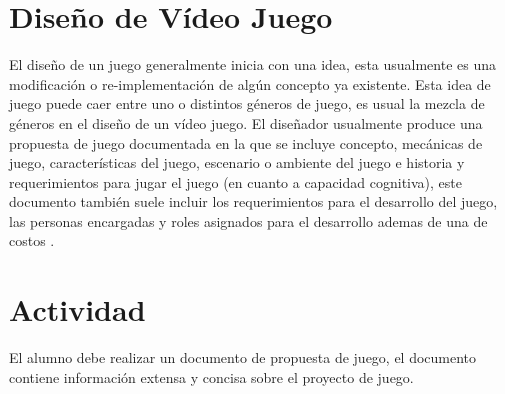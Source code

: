 \section{Diseño de Vídeo Juego}
El diseño de un juego generalmente inicia con una idea, esta usualmente es una modificación o re-implementación de algún concepto ya existente. Esta idea de juego puede caer entre uno o distintos géneros de juego, es usual la mezcla de géneros en el diseño de un vídeo juego. El diseñador usualmente produce una propuesta de juego documentada en la que se incluye concepto, mecánicas de juego, características del juego, escenario o ambiente del juego e historia y requerimientos para jugar el juego (en cuanto a capacidad cognitiva), este documento también suele incluir los requerimientos para el desarrollo del juego, las personas encargadas y roles asignados para el desarrollo ademas de una  de costos \cite[p.~101]{erikgamedevelopment}. 

\section{Actividad}
El alumno debe realizar un documento de propuesta de juego, el documento contiene información extensa y concisa sobre el proyecto de juego.

